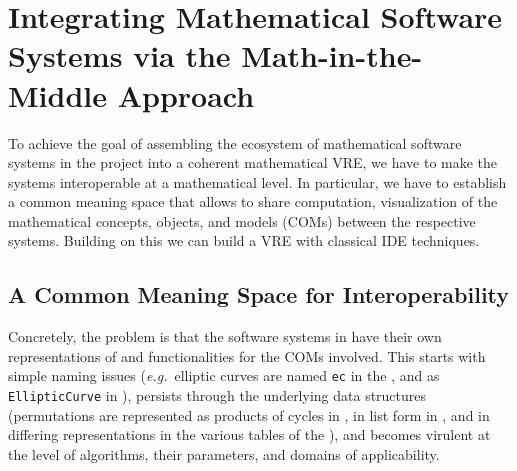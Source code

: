 \section{Integrating Mathematical Software Systems via the Math-in-the-Middle Approach}\label{sec:mitm}



To achieve the goal of assembling the ecosystem of mathematical software systems in the
\ODK project into a coherent mathematical VRE, we have to make the systems interoperable at
a mathematical level. In particular, we have to establish a common meaning space that
allows to share computation, visualization of the mathematical concepts, objects, and
models (COMs) between the respective systems. Building on this we can build a VRE with
classical IDE techniques.


\subsection{A Common Meaning Space for Interoperability}


Concretely, the problem is that the software systems in \ODK have their own
representations of and functionalities for the COMs involved.
%
%
This starts with simple
naming issues (\emph{e.g.}\ elliptic curves are named \lstinline|ec| in the \LMFDB, and as
\lstinline|EllipticCurve| in \Sage), persists through the underlying data structures
(permutations are represented as products of cycles in \GAP, in list form in \Sage, and in
differing representations in the various tables of the \LMFDB), and becomes virulent at
the level of algorithms, their parameters, and domains of applicability.

